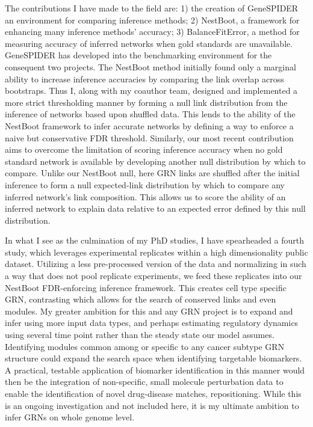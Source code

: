 The contributions I have made to the field are: 1) the creation of GeneSPIDER an environment for comparing inference methods; 2) NestBoot, a framework for enhancing many inference methods’ accuracy; 3) BalanceFitError, a method for measuring accuracy of inferred networks when gold standards are unavailable. GeneSPIDER has developed into the benchmarking environment for the consequent two projects. The NestBoot method initially found only a marginal ability to increase inference accuracies by comparing the link overlap across bootstraps. Thus I, along with my coauthor team, designed and implemented a more strict thresholding manner by forming a null link distribution from the inference of networks based upon shuffled data. This lends to the ability of the NestBoot framework to infer accurate networks by defining a way to enforce a naive but conservative FDR threshold. Similarly, our most recent contribution aims to overcome the limitation of scoring inference accuracy when no gold standard network is available by developing another null distribution by which to compare. Unlike our NestBoot null, here GRN links are shuffled after the initial inference to form a null expected-link distribution by which to compare any inferred network’s link composition. This allows us to score the ability of an inferred network to explain data relative to an expected error defined by this null distribution. 

In what I see as the culmination of my PhD studies, I have spearheaded a fourth study, which leverages experimental replicates within a high dimensionality public dataset. Utilizing a less pre-processed version of the data and normalizing in such a way that does not pool replicate experiments, we feed these replicates into our NestBoot FDR-enforcing inference framework. This creates cell type specific GRN, contrasting which allows for the search of conserved links and even modules. My greater ambition for this and any GRN project is to expand and infer using more input data types, and perhaps estimating regulatory dynamics using several time point rather than the steady state our model assumes. Identifying modules common among or specific to any cancer subtype GRN structure could expand the search space when identifying targetable biomarkers. A practical, testable application of biomarker identification in this manner would then be the integration of non-specific, small molecule perturbation data to enable the identification of novel drug-disease matches, \ie repositioning. While this is an ongoing investigation and not included here, it is my ultimate ambition to infer GRNs on whole genome level.

